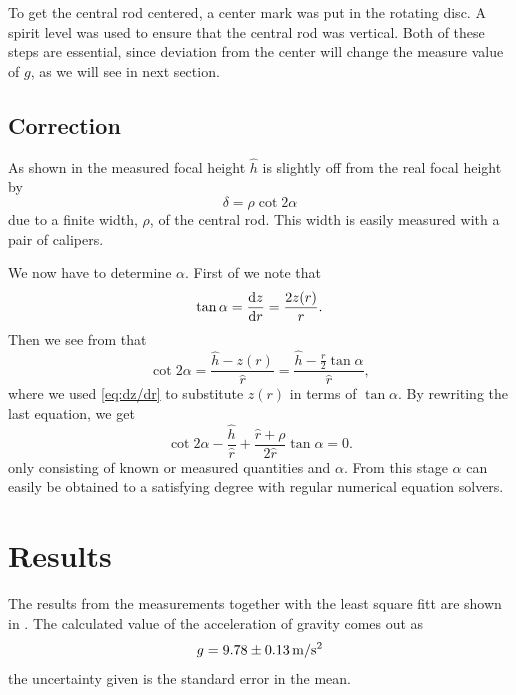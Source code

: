 \documentclass[11pt,
a4paper, 
swedish, english]{article}
\begin{document}
To get the central rod centered, a center mark was put in the rotating
disc. A spirit level was used to ensure that the central rod was
vertical. Both of these steps are essential, since deviation from the
center will change the measure value of $g$, as we will see in next
section. 


\subsection{Correction}\label{sec:corrections}
As shown in  the measured focal height
$\hat{h}$ is slightly off from the real focal height by 
\begin{equation}%
\delta=\rho\cot 2\alpha
\end{equation}
due to a finite width, $\rho$, of the central rod. This width is easily
measured with a pair of calipers.

We now have to determine $\alpha$. First of we note that
\begin{equation}\label{eq:dz/dr}
\tan\alpha=\dv{z}{r} =\frac{2 z(r)}{r}.
\end{equation}
Then we see from  that 
\begin{equation}
\cot 2\alpha =\frac{\hat{h} - z(r)}{\hat{r}} 
= \frac{\hat{h}-\frac{r}{2}\tan\alpha }{\hat{r}},
\end{equation}
where we used \eqref{eq:dz/dr} to substitute $z(r)$ in terms of
$\tan\alpha$. By rewriting the last equation, we get
\begin{equation}
\cot 2\alpha 
-\frac{\hat{h}}{\hat{r}}
+\frac{\hat{r}+\rho}{2\hat{r}}\tan\alpha  = 0.
\end{equation}
only consisting of known or measured quantities and $\alpha$. From
this stage $\alpha$ can easily be obtained to a satisfying degree with
regular numerical equation solvers.



\section{Results}
The results from the measurements together with the least square fitt
are shown in . The calculated value of the
acceleration of gravity comes out as
\begin{equation}
g=\unit[9.78\pm 0.13]{m/s^2}
\end{equation}
the uncertainty given is the standard error in the mean.
\end{document}
